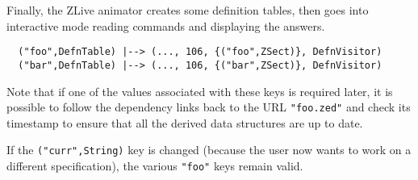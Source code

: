 \documentclass{llncs} %
\begin{document}
Finally, the ZLive animator creates some definition tables, then goes into
interactive mode reading commands and displaying the answers. 
\begin{small}
\begin{verbatim}
  ("foo",DefnTable) |--> (..., 106, {("foo",ZSect)}, DefnVisitor)
  ("bar",DefnTable) |--> (..., 106, {("bar",ZSect)}, DefnVisitor)
\end{verbatim}
\end{small}

Note that if one of the values associated with these keys is
required later, it is possible to follow the dependency links
back to the URL \texttt{"foo.zed"} and check its timestamp to
ensure that all the derived data structures are up to date.

If the \texttt{("curr",String)} key is changed (because the
user now wants to work on a different specification), the
various \texttt{"foo"} keys remain valid.



\end{document}
